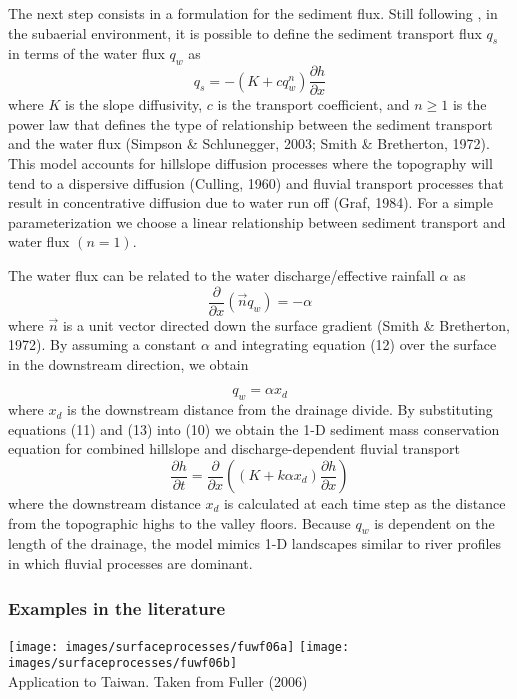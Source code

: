 The next step consists in a formulation for the sediment flux. Still following \cite{anpa19}, 
in the subaerial environment, it is possible to define the sediment transport 
flux $q_s$ in terms of the water flux $q_w$ as
\[
q_s=-(K+c q_w^n) \frac{\partial h}{\partial x}
\]
where $K$ is the slope diffusivity, $c$ is the transport coefficient, 
and $n \geq 1$ is the power law that defines the type
of relationship between the sediment transport and the water flux 
(Simpson \& Schlunegger, 2003; Smith \& Bretherton, 1972).
This model accounts for hillslope diffusion processes where the topography will tend to
a dispersive diffusion (Culling, 1960) and fluvial transport processes that result in concentrative diffusion
due to water run off (Graf, 1984). For a simple parameterization we choose a linear relationship between
sediment transport and water flux $(n=1)$.

The water flux can be related to the water discharge/effective rainfall $\alpha$ as
\[
\frac{\partial}{\partial x} (\vec{n} q_w) = -\alpha
\]
where $\vec n$ is a unit vector directed down the surface gradient (Smith \& Bretherton, 1972). 
By assuming a constant $\alpha$ and integrating equation (12) over the surface in the downstream direction, we obtain

\[
q_w = \alpha x_d
\]
where $x_d$ is the downstream distance from the drainage divide. By substituting equations (11) and
(13) into (10) we obtain the 1-D sediment mass conservation equation for combined hillslope and
discharge-dependent fluvial transport
\[
\frac{\partial h}{\partial t} = \frac{\partial}{\partial x} \left( (K+k \alpha x_d) 
\frac{\partial h}{\partial x}   \right)
\]
where the downstream distance $x_d$ is calculated at each time step as the distance from the topographic highs
to the valley floors. Because $q_w$ is dependent on the length of the drainage, the model mimics 1-D landscapes
similar to river profiles in which fluvial processes are dominant.

\subsubsection{Examples in the literature}

\begin{center}
\texttt{[image: images/surfaceprocesses/fuwf06a]}
\texttt{[image: images/surfaceprocesses/fuwf06b]}\\
{\captionfont Application to Taiwan. Taken from Fuller \etal (2006) \cite{fuwf06}}
\end{center}


